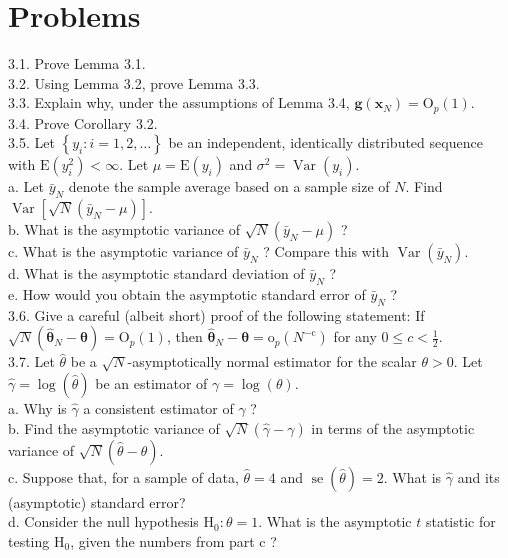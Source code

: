 \documentclass[10pt]{article}
\begin{document}
\section*{Problems}
3.1. Prove Lemma 3.1.\\
3.2. Using Lemma 3.2, prove Lemma 3.3.\\
3.3. Explain why, under the assumptions of Lemma 3.4, $\mathbf{g}\left(\mathbf{x}_{N}\right)=\mathrm{O}_{p}(1)$.\\
3.4. Prove Corollary 3.2.\\
3.5. Let $\left\{y_{i}: i=1,2, \ldots\right\}$ be an independent, identically distributed sequence with $\mathrm{E}\left(y_{i}^{2}\right)<\infty$. Let $\mu=\mathrm{E}\left(y_{i}\right)$ and $\sigma^{2}=\operatorname{Var}\left(y_{i}\right)$.\\
a. Let $\bar{y}_{N}$ denote the sample average based on a sample size of $N$. Find $\operatorname{Var}\left[\sqrt{N}\left(\bar{y}_{N}-\mu\right)\right]$.\\
b. What is the asymptotic variance of $\sqrt{N}\left(\bar{y}_{N}-\mu\right)$ ?\\
c. What is the asymptotic variance of $\bar{y}_{N}$ ? Compare this with $\operatorname{Var}\left(\bar{y}_{N}\right)$.\\
d. What is the asymptotic standard deviation of $\bar{y}_{N}$ ?\\
e. How would you obtain the asymptotic standard error of $\bar{y}_{N}$ ?\\
3.6. Give a careful (albeit short) proof of the following statement: If $\sqrt{N}\left(\hat{\boldsymbol{\theta}}_{N}-\boldsymbol{\theta}\right)= \mathrm{O}_{p}(1)$, then $\hat{\boldsymbol{\theta}}_{N}-\boldsymbol{\theta}=\mathrm{o}_{p}\left(N^{-\mathrm{c}}\right)$ for any $0 \leq c<\frac{1}{2}$.\\
3.7. Let $\hat{\theta}$ be a $\sqrt{N}$-asymptotically normal estimator for the scalar $\theta>0$. Let $\hat{\gamma}=\log (\hat{\theta})$ be an estimator of $\gamma=\log (\theta)$.\\
a. Why is $\hat{\gamma}$ a consistent estimator of $\gamma$ ?\\
b. Find the asymptotic variance of $\sqrt{N}(\hat{\gamma}-\gamma)$ in terms of the asymptotic variance of $\sqrt{N}(\hat{\theta}-\theta)$.\\
c. Suppose that, for a sample of data, $\hat{\theta}=4$ and $\operatorname{se}(\hat{\theta})=2$. What is $\hat{\gamma}$ and its (asymptotic) standard error?\\
d. Consider the null hypothesis $\mathrm{H}_{0}: \theta=1$. What is the asymptotic $t$ statistic for testing $\mathrm{H}_{0}$, given the numbers from part c ?\\
\end{document}
